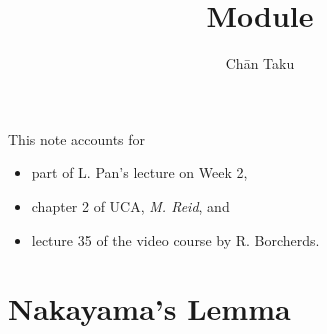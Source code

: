 \documentclass{article}
\title{Module}
\author{Ch\=an Taku}
\begin{document}
\maketitle

This note accounts for
\begin{itemize}
    \item part of L. Pan's lecture on Week 2,
    \item chapter 2 of UCA, \textit{M. Reid}, and
    \item lecture 35 of the video course by R. Borcherds.
\end{itemize}

\section{Nakayama's Lemma}

% 
% 
\end{document}
